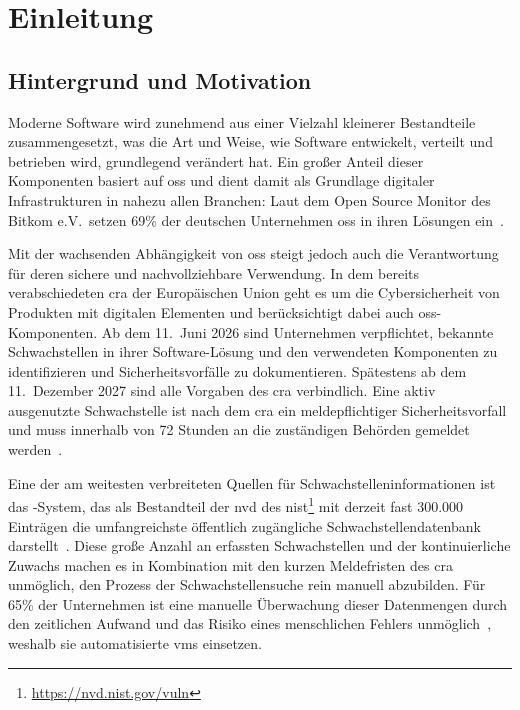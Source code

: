 \chapter{Einleitung}\label{ch:einleitung}


\section{Hintergrund und Motivation}\label{sec:hintergrund-motivation}

Moderne Software wird zunehmend aus einer Vielzahl kleinerer Bestandteile zusammengesetzt, was die Art und Weise, wie Software entwickelt, verteilt und betrieben wird, grundlegend verändert hat.
Ein großer Anteil dieser Komponenten basiert auf \acrfull{oss} und dient damit als Grundlage digitaler Infrastrukturen in nahezu allen Branchen:
Laut dem Open Source Monitor des Bitkom e.V.\ setzen 69\% der deutschen Unternehmen \acrshort{oss} in ihren Lösungen ein\ \autocite{OpenSourceMonitorWintergerst}.

Mit der wachsenden Abhängigkeit von \acrshort{oss} steigt jedoch auch die Verantwortung für deren sichere und nachvollziehbare Verwendung.
In dem bereits verabschiedeten \acrfull{cra} der Europäischen Union geht es um die Cybersicherheit von Produkten mit digitalen Elementen und berücksichtigt dabei auch \acrshort{oss}-Komponenten.
Ab dem 11.\ Juni 2026 sind Unternehmen verpflichtet, bekannte Schwachstellen in ihrer Software-Lösung und den verwendeten Komponenten zu identifizieren und Sicherheitsvorfälle zu dokumentieren.
Spätestens ab dem 11.\ Dezember 2027 sind alle Vorgaben des \acrshort{cra} verbindlich.
Eine aktiv ausgenutzte Schwachstelle ist nach dem \acrshort{cra} ein meldepflichtiger Sicherheitsvorfall und muss innerhalb von 72 Stunden an die zuständigen Behörden gemeldet werden\ \autocite{eu2024cra}.

Eine der am weitesten verbreiteten Quellen für Schwachstelleninformationen ist das -System, das als Bestandteil der \acrfull{nvd} des \acrfull{nist}\footnote{\url{https://nvd.nist.gov/vuln}} mit derzeit fast 300.000 Einträgen die umfangreichste öffentlich zugängliche Schwachstellendatenbank darstellt\ \autocite{nvd12mai2025dashboard}.
Diese große Anzahl an erfassten Schwachstellen und der kontinuierliche Zuwachs machen es in Kombination mit den kurzen Meldefristen des \acrshort{cra} unmöglich, den Prozess der Schwachstellensuche rein manuell abzubilden.
Für 65\% der Unternehmen ist eine manuelle Überwachung dieser Datenmengen durch den zeitlichen Aufwand und das Risiko eines menschlichen Fehlers unmöglich\ \autocite{OpenSourceMonitorWintergerst}, weshalb sie automatisierte \acrfull{vms} einsetzen.

